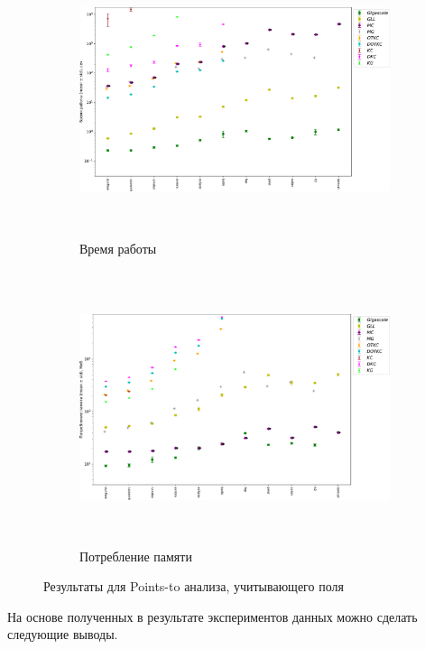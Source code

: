 \begin{figure}[h!]
    \begin{subfigure}{\textwidth}
        \centering
        \includegraphics[width=\linewidth, height=8cm]{figures/java_time.pdf}
        \caption{Время работы}
        \label{fig:java_result_time}
    \end{subfigure}
    \begin{subfigure}{\textwidth}
        \centering
        \includegraphics[width=\linewidth, height=8cm]{figures/java_mem.pdf}
        \caption{Потребление памяти}
        \label{fig:java_result_mem}
    \end{subfigure}
    \caption{Результаты для Points-to анализа, учитывающего поля}
    \label{fig:java_result}
\end{figure}

На основе полученных в результате экспериментов данных можно сделать следующие выводы.

